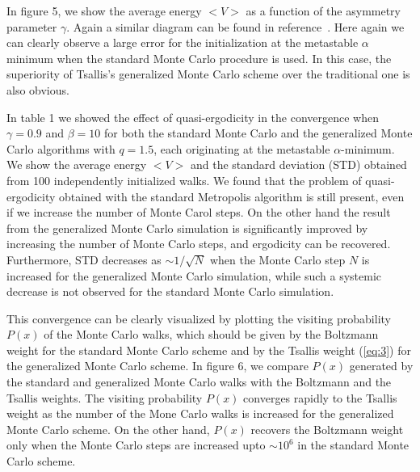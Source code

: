 In figure 5, we show the average energy $<V>$ as a function of
the asymmetry parameter $\gamma$. Again a similar diagram can
be found in reference~\cite{FFD}. Here again we can
clearly observe a large error for the initialization at the
metastable $\alpha$ minimum when the standard Monte Carlo
procedure is used. In this case, the superiority of Tsallis's
generalized Monte Carlo scheme over the traditional one is
also obvious.

In table 1 we showed the effect of quasi-ergodicity in the
convergence when $\gamma=0.9$ and $\beta=10$ for both
the standard Monte Carlo and the generalized Monte Carlo
algorithms with $q=1.5$, each originating at the metastable
$\alpha$-minimum. We show the average energy $<V>$ and the
standard deviation (STD) obtained from 100 independently
initialized walks. We found that the problem of quasi-ergodicity
obtained with the standard Metropolis algorithm is still present,
even if we increase the number of Monte Carol steps. On the other
hand the result from the generalized Monte Carlo simulation is
significantly improved by increasing the number of Monte Carlo
steps, and ergodicity can be recovered. Furthermore, STD
decreases as $\sim 1/\sqrt{N}$ when the Monte Carlo step $N$ is
increased for the generalized Monte Carlo simulation, while such
a systemic decrease is not observed for the standard Monte
Carlo simulation.

This convergence can be clearly visualized by plotting the
visiting probability $P(x)$ of the Monte Carlo walks, which
should be given by the Boltzmann weight for the standard
Monte Carlo scheme and by the Tsallis weight (\ref{eq:3}) for
the generalized Monte Carlo scheme. In figure 6, we compare
$P(x)$ generated by the standard and generalized Monte Carlo
walks with the Boltzmann and the Tsallis weights. The visiting
probability $P(x)$ converges rapidly to the Tsallis weight as
the number of the Mone Carlo walks is increased for the
generalized Monte Carlo scheme. On the other hand, $P(x)$
recovers the Boltzmann weight only when the Monte Carlo steps
are increased upto $\sim 10^{6}$ in the standard Monte
Carlo scheme.

